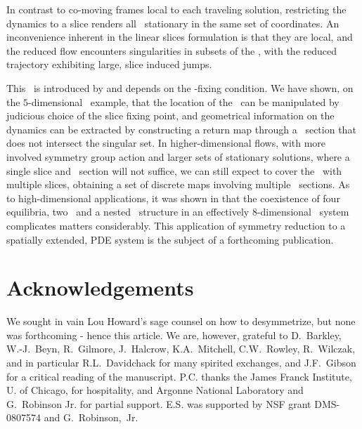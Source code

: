 \documentclass[preprint,number,sort&compress]{elsarticle}
\begin{document}
In contrast to co-moving frames local to each traveling
solution, {restricting the dynamics}
to a slice renders all \reqva\
stationary in the same set of coordinates. An inconvenience
inherent in the linear slices formulation is that they are
local, and the reduced flow encounters singularities in
subsets of the \reducedsp, with the reduced trajectory exhibiting
large, slice induced jumps.

This \sset\ is introduced by and 
depends on the \slice-fixing condition. We have shown,
on the $5$-dimensional \cLe\ example, that the location of
the \sset\ can be manipulated by judicious choice of the slice
fixing point, and geometrical information on the dynamics can
be extracted by constructing a return map through a
\Poincare\ section that does not intersect the singular set.
In higher-dimensional flows, with more involved symmetry
group action and larger sets of stationary solutions, where a
single slice and \Poincare\ section will not suffice, we can
still expect to cover the \reducedsp\ with multiple slices,
obtaining a set of discrete maps involving multiple
\Poincare\ sections. As to high-dimensional applications,
it was shown in  that the coexistence
of four equilibria, two \reqva\ and a nested \fixedsp\
structure in an effectively $8$-dimensional \KS\
system complicates matters considerably. This
application of symmetry reduction to a spatially extended,
PDE system is the
subject of a forthcoming publication\rf{SCD09b}.


\section*{Acknowledgements}
We sought in vain Lou Howard's sage counsel on how
to desymmetrize, but none was forthcoming - hence this article.
We are, however, grateful to
D.~Barkley,
W.-J.~Beyn,
R.~Gilmore,
J.~Halcrow,
K.A.~Mitchell,
C.W.~Rowley,
R.~Wilczak,
and in particular R.L.~Davidchack for many spirited exchanges,
and J.F.~Gibson for a critical reading of the manuscript.
P.C. thanks the
James Franck Institute, U. of Chicago,
for hospitality, and Argonne National Laboratory and
G.~Robinson Jr. for partial support.
E.S. was supported by NSF grant DMS-0807574 and G.~Robinson,~Jr.

\appendix

\PublicPrivate{}{
\section{\label{s:StabReq} Stability of \reqva}
    
    } %

% 



\ifdraft
    \newpage
    
    
\fi
\end{document}
